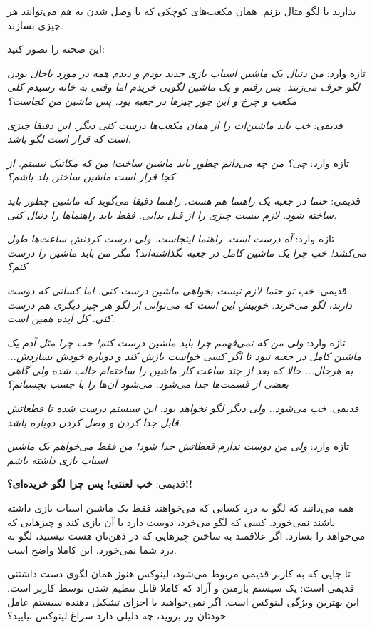 بذارید با لگو مثال بزنم. همان مکعب‌های کوچکی که با وصل شدن به هم می‌توانند هر چیزی بسازند. 
\begin{mdframed}
این صحنه را تصور کنید:

تازه وارد:
\emph{من دنبال یک ماشین اسباب بازی جدید بودم و دیدم همه در مورد باحال بودن لگو حرف می‌زنند. پس رفتم و یک ماشین لگویی خریدم اما وقتی به خانه رسیدم کلی مکعب و چرخ و این جور چیزها در جعبه بود. پس ماشین من کجاست؟}

قدیمی:
\emph{خب باید ماشین‌ات را از همان مکعب‌ها درست کنی دیگر. این دقیقا چیزی است که قرار است لگو باشد.}

تازه وارد:
\emph{چی؟ من چه می‌دانم چطور باید ماشین ساخت! من که مکانیک نیستم. از کجا قرار است ماشین ساختن بلد باشم؟}

قدیمی:
\emph{حتما در جعبه یک راهنما هم هست. راهنما دقیقا می‌گوید که ماشین چطور باید ساخته شود. لازم نیست چیزی را از قبل بدانی. فقط باید راهنماها را دنبال کنی.}

تازه وارد:
\emph{آه درست است. راهنما اینجاست. ولی درست کردنش ساعت‌ها طول می‌کشد! خب چرا یک ماشین کامل در جعبه نگذاشته‌اند؟ مگر من باید ماشین را درست کنم؟}

قدیمی:
\emph{خب تو حتما لازم نیست بخواهی ماشین درست کنی. اما کسانی که دوست دارند، لگو می‌خرند. خوبیش این است که می‌توانی از لگو هر چیز دیگری هم درست کنی. کل ایده همین است.}

تازه وارد:
\emph{ولی من که نمی‌فهمم چرا باید ماشین درست کنم! خب چرا مثل آدم یک ماشین کامل در جعبه نبود تا اگر کسی خواست بازش کند و دوباره خودش بسازدش... به هرحال... حالا که بعد از چند ساعت کار ماشین را ساخته‌ام جالب شده ولی گاهی بعضی از قسمت‌ها جدا می‌شود. می‌شود آن‌ها را با چسب بچسبانم؟}

قدیمی:
\emph{خب می‌شود.. ولی دیگر لگو نخواهد بود. این سیستم درست شده تا قطعاتش قابل جدا کردن و وصل کردن دوباره باشد.}

تازه وارد:
\emph{ولی من دوست ندارم قعطاتش جدا شود! من فقط می‌خواهم یک ماشین اسباب بازی داشته باشم}

قدیمی:
\textbf{خب لعنتی! پس چرا لگو خریده‌ای؟!!}
\end{mdframed}
همه می‌دانند که لگو به درد کسانی که می‌خواهند فقط یک ماشین اسباب بازی داشته باشند نمی‌خورد. کسی که لگو می‌خرد،‌ دوست دارد با آن بازی کند و چیزهایی که می‌خواهد را بسازد. اگر علاقمند به ساختن چیزهایی که در ذهن‌تان هست نیستید، لگو به درد شما نمی‌خورد. این کاملا واضح است.

تا جایی که به کاربر قدیمی مربوط می‌شود،‌ لینوکس هنوز همان لگوی دست داشتنی قدیمی است: یک سیستم بازمتن و آزاد که کاملا قابل تنظیم شدن توسط کاربر است. این بهترین ویژگی لینوکس است. اگر نمی‌خواهید با اجزای تشکیل دهنده سیستم عامل خودتان ور بروید،‌ چه دلیلی دارد سراغ لینوکس بیایید؟

